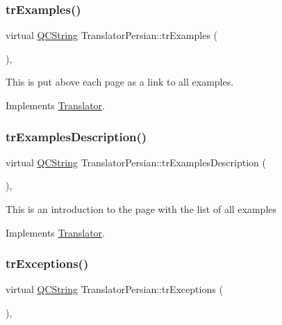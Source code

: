 \subsubsection{\texorpdfstring{trExamples()}{trExamples()}}
{\footnotesize\ttfamily virtual \mbox{\hyperlink{class_q_c_string}{Q\+C\+String}} Translator\+Persian\+::tr\+Examples (\begin{DoxyParamCaption}{ }\end{DoxyParamCaption})\hspace{0.3cm}{\ttfamily [inline]}, {\ttfamily [virtual]}}

This is put above each page as a link to all examples. 

Implements \mbox{\hyperlink{class_translator}{Translator}}.

\mbox{\label{class_translator_persian_a5690397f2d3d92f2a367d01206ee24aa}} 
\subsubsection{\texorpdfstring{trExamplesDescription()}{trExamplesDescription()}}
{\footnotesize\ttfamily virtual \mbox{\hyperlink{class_q_c_string}{Q\+C\+String}} Translator\+Persian\+::tr\+Examples\+Description (\begin{DoxyParamCaption}{ }\end{DoxyParamCaption})\hspace{0.3cm}{\ttfamily [inline]}, {\ttfamily [virtual]}}

This is an introduction to the page with the list of all examples 

Implements \mbox{\hyperlink{class_translator}{Translator}}.

\mbox{\label{class_translator_persian_aa6bdf30a3fc86ef8e6fd9f8e0f762496}} 
\subsubsection{\texorpdfstring{trExceptions()}{trExceptions()}}
{\footnotesize\ttfamily virtual \mbox{\hyperlink{class_q_c_string}{Q\+C\+String}} Translator\+Persian\+::tr\+Exceptions (\begin{DoxyParamCaption}{ }\end{DoxyParamCaption})\hspace{0.3cm}{\ttfamily [inline]}, {\ttfamily [virtual]}}

